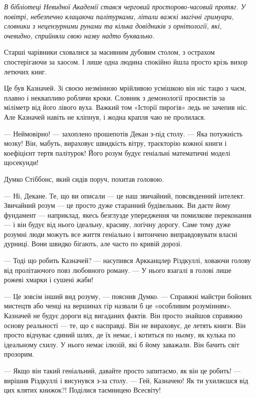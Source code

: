\documentclass[12pt, a4paper, openany]{book}
\begin{document}
\begin{terrybox}
\textit{В бібліотеці Невидної Академії стався черговий просторово-часовий протяг. У повітрі, небезпечно клацаючи палітурками, літали важкі магічні гримуари, словники з нецензурними рунами та кілька довідників з орнітології, які, очевидно, сприйняли свою назву надто буквально.}

\medskip

Старші чарівники сховалися за масивним дубовим столом, з острахом спостерігаючи за хаосом. І лише одна людина спокійно йшла просто крізь вихор летючих книг.

Це був Казначей. Зі своєю незмінною мрійливою усмішкою він ніс тацю з чаєм, плавно і неквапливо роблячи кроки. Словник з демонології просвистів за міліметр від його лівого вуха. Важкий том «Історії пирогів» ледь не зачепив ніс. Але Казначей навіть не кліпнув, і жодна крапля чаю не пролилася.

--- Неймовірно! --- захоплено прошепотів Декан з-під столу. --- Яка потужність мозку! Він, мабуть, вираховує швидкість вітру, траєкторію кожної книги і коефіцієнт тертя палітурок! Його розум будує геніальні математичні моделі щосекунди!

Думко Стіббонс, який сидів поруч, похитав головою.

--- Ні, Декане. Те, що ви описали --- це наш звичайний, повсякденний інтелект. Звичайний розум --- це просто дуже старанний будівельник. Ви даєте йому фундамент --- наприклад, якесь безглузде упередження чи помилкове переконання --- і він будує від нього ідеальну, красиву, логічну дорогу. Саме тому дуже розумні люди можуть все життя геніально і витончено виправдовувати власні дурниці. Вони швидко бігають, але часто по кривій дорозі.

--- Тоді що робить Казначей? --- насупився Аркканцлер Різдкуллі, ховаючи голову від пролітаючого повз любовного роману. --- У нього взагалі в голові лише рожеві хмарки і сушені жаби!

--- Це зовсім інший вид розуму, --- пояснив Думко. --- Справжні майстри бойових мистецтв або ченці на вершинах гір назвали б це «особливим розумінням». Казначей не будує дороги від вигаданих фактів. Він просто знайшов справжню основу реальності --- те, що є насправді. Він не вираховує, де летять книги. Він просто відчуває єдиний шлях, де їх немає, і котиться по ньому, як кулька по ідеальному схилу. У нього немає ілюзій, які б йому заважали. Він бачить світ прозорим.

--- Якщо він такий геніальний, давайте просто запитаємо, як він це робить! --- вирішив Різдкуллі і висунувся з-за столу. --- Гей, Казначею! Як ти ухиляєшся від цих клятих книжок?! Поділися таємницею Всесвіту!


\end{terrybox}
\end{document}
